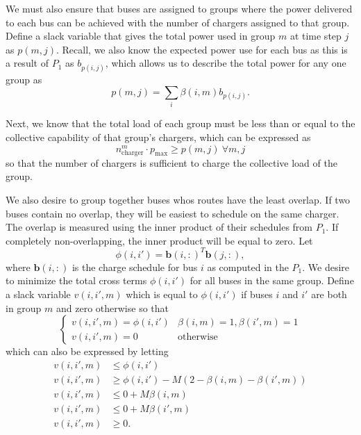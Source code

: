 \par We must also ensure that buses are assigned to groups where the power delivered to each bus can be achieved with the number of chargers assigned to that group. Define a slack variable that gives the total power used in group $m$ at time step $j$ as $p(m,j)$. Recall, we also know the expected power use for each bus as this is a result of $P_1$ as $b_{p(i,j)}$, which allows us to describe the total power for any one group as
\begin{equation}\label{eqn:groups:groupPower}
 p(m,j) = \sum_i\beta(i,m)b_{p(i,j)}.
\end{equation}
\par Next, we know that the total load of each group must be less than or equal to the collective capability of that group's chargers, which can be expressed as
\begin{equation}\label{eqn:groups:chargeLimit}
	n^m_{\text{charger}}\cdot p_{\text{max}} \ge p(m,j) \ \forall m,j
\end{equation}
so that the number of chargers is sufficient to charge the collective load of the group. 
\par We also desire to group together buses whos routes have the least overlap. If two buses contain no overlap, they will be easiest to schedule on the same charger.  The overlap is measured using the inner product of their schedules from $P_1$.  If completely non-overlapping, the inner product will be equal to zero. Let
\begin{equation*}
\phi(i,i') = \mathbf{b}(i,:)^T\mathbf{b}(j,:),
\end{equation*}
where $\mathbf{b}(i,:)$ is the charge schedule for bus $i$ as computed in the $P_1$. We desire to minimize the total cross terms $\phi(i,i')$ for all buses in the same group.  Define a slack variable $v(i,i',m)$ which is equal to $\phi(i,i')$ if buses $i$ and $i'$ are both in group $m$ and zero otherwise so that
\begin{equation*}
	\begin{cases}
		v(i,i',m) = \phi(i,i') & \beta(i,m) = 1, \beta(i',m) = 1 \\
		v(i,i',m) = 0 & \text{otherwise}
	\end{cases}
\end{equation*}
which can also be expressed by letting
\begin{equation}\label{eqn:groups:innerProd}\begin{aligned}
	v(i,i',m) &\le \phi(i,i') \\
	v(i,i',m) &\ge \phi(i,i') - M\left (2 - \beta(i,m) - \beta(i',m)\right ) \\
	v(i,i',m) &\le 0 + M\beta(i,m) \\
	v(i,i',m) &\le 0 + M\beta(i',m) \\
	v(i,i',m) &\ge 0.
\end{aligned}\end{equation}
